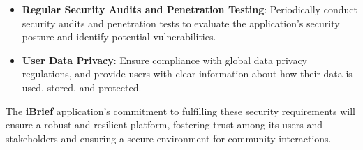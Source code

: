 \begin{itemize}
    \item \textbf{Regular Security Audits and Penetration Testing}: Periodically conduct security audits and penetration tests to evaluate the application's security posture and identify potential vulnerabilities.

    \item \textbf{User Data Privacy}: Ensure compliance with global data privacy regulations, and provide users with clear information about how their data is used, stored, and protected.
\end{itemize}

The \textbf{iBrief} application's commitment to fulfilling these security requirements will ensure a robust and resilient platform, fostering trust among its users and stakeholders and ensuring a secure environment for community interactions.


